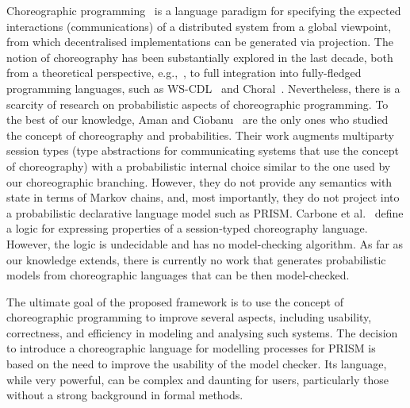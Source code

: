 %
  Choreographic programming~\cite{M23} is a
language paradigm for specifying the expected interactions
(communications) of a distributed system from a global viewpoint,
from which decentralised implementations can be generated via
projection. The notion of choreography has been substantially explored
in the last decade, both from a theoretical perspective,
e.g.,~\cite{CHY12,CM13}, to full integration into fully-fledged
programming languages, such as WS-CDL~\cite{HYC07b} and
Choral~\cite{GMP24}. Nevertheless, there is a scarcity of research on
probabilistic aspects of choreographic programming.
%
To the best of our knowledge, Aman and Ciobanu~\cite{AC19,AC22} are
the only ones who studied the concept of choreography and
probabilities. Their work augments multiparty session types (type
abstractions for communicating systems that use the concept of
choreography) with a probabilistic internal choice similar to the one
used by our choreographic branching. However, they do not provide any
semantics with state in terms of Markov chains, and, most importantly,
they do not project into a probabilistic declarative language model
such as PRISM.
%
Carbone et al.~\cite{CGHL10} define a logic for expressing properties
of a session-typed choreography language. However, the logic is
undecidable and has no model-checking algorithm. %
%
As far as our knowledge extends, there is currently no work that
generates probabilistic models from choreographic languages that can
be then model-checked.



%
The ultimate goal of the proposed framework is to use the concept of
choreographic programming to improve several aspects, including
usability, correctness, and efficiency in modeling and analysing such
systems.
%
The decision to introduce a choreographic language for modelling
processes for PRISM is based on the need to improve the usability of
the model checker. Its language, while very powerful, can be complex
and daunting for users, particularly those without a strong background
in formal methods.

